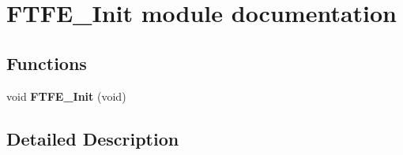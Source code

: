 \hypertarget{group___f_t_f_e___init__module}{}\section{F\+T\+F\+E\+\_\+\+Init module documentation}
\label{group___f_t_f_e___init__module}
\subsection*{Functions}
\begin{DoxyCompactItemize}
\item 
void {\bfseries F\+T\+F\+E\+\_\+\+Init} (void)\hypertarget{group___f_t_f_e___init__module_ga024c282b0c54d2fb40f43b1d5fe1fbac}{}\label{group___f_t_f_e___init__module_ga024c282b0c54d2fb40f43b1d5fe1fbac}

\end{DoxyCompactItemize}


\subsection{Detailed Description}
